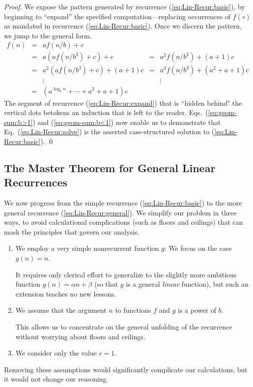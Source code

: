 \begin{proof}
We expose the pattern generated by recurrence (\ref{eq:Lin-Recur:basic}), by beginning to ``expand'' the specified computation---replacing occurrences of $f(\circ)$ as mandated in recurrence (\ref{eq:Lin-Recur:basic}).  Once we discern the pattern, we jump to the general form.
\begin{equation}
\label{eq:Lin-Recur:expand}
\begin{array}{lcccc}
f(n) & = & a f(n/b) + c & & \\
     & = & a \left( a f(n/b^2) + c \right) + c
             & = & a^2 f(n/b^2) + (a+1)c \\
     & = & a^2 \left( a f(n/b^3) + c \right) + (a+1)c
             & = & a^3 f(n/b^3) + (a^2+a+1)c \\
     &   & \vdots & & \vdots \\
     & = & 
{\displaystyle
\left(a^{\log_b n} + \cdots +a^2+a+1 \right) c
} & &
\end{array}
\end{equation}
The segment of recurrence (\ref{eq:Lin-Recur:expand}) that is ``hidden behind" the vertical dots betokens an induction that is left to the reader.  Eqs.~(\ref{eq:geom-sum:b>1}) and (\ref{eq:geom-sum:b<1}) now enable us to demonstrate that Eq.~(\ref{eq:Lin-Recur:solve}) is the asserted case-structured solution to (\ref{eq:Lin-Recur:basic}).  \qed
\end{proof}


\subsection{The Master Theorem for General Linear Recurrences} 
\label{sec:linear-recurrence-general}

We now progress from the simple recurrence (\ref{eq:Lin-Recur:basic}) to the more general recurrence (\ref{eq:Lin-Recur:general}).  We simplify our problem in three ways, to avoid calculational complications (such as floors and ceilings) that can mask the principles that govern
our analysis.
\begin{enumerate}
\item
We employ a very simple nonrecurrent function $g$: We focus on the case $g(n) = n$.

\smallskip

It requires only clerical effort to generalize to the slightly more ambitious function $g(n) = \alpha n + \beta$ (so that $g$ is a general {\em linear} function), but such an extension teaches no new lessons.
\medskip\item
We assume that the argument $n$ to functions $f$ and $g$ is a power of $b$.

\smallskip

This allows us to concentrate on the general unfolding of the recurrence without worrying about floors and ceilings.

\medskip\item
We consider only the value $c=1$.
\end{enumerate}
Removing these assumptions would significantly complicate our calculations, but it would not change our reasoning.

